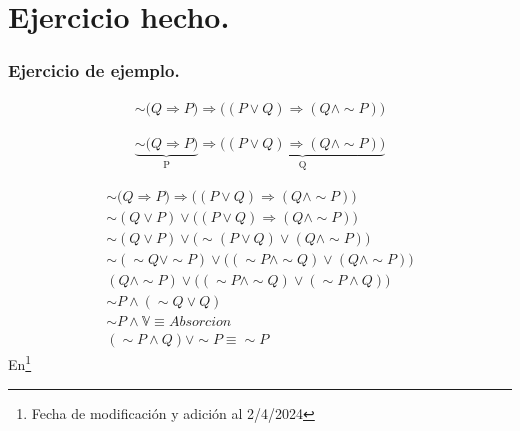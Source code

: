 \documentclass{article}
\begin{document}
\pagebreak

\section*{Ejercicio hecho.}
\subsubsection*{Ejercicio de ejemplo.}

\begin{gather*}
	\sim\big(Q \Rightarrow P\big) \Rightarrow \big((P \vee Q) \Rightarrow (Q \land \sim P)\big) 
\end{gather*}

\begin{gather*}
	\underbrace{\sim\big(Q \Rightarrow P\big)}_\textrm{P} \Rightarrow \underbrace{\big((P \vee Q) \Rightarrow (Q \land \sim P)\big)}_\textrm{Q}
\end{gather*}

\begin{gather}
	\sim\big(Q \Rightarrow P\big) \Rightarrow \big((P \vee Q) \Rightarrow (Q \land \sim P)\big) \\
	\sim(Q \vee P) \vee \big((P \vee Q) \Rightarrow (Q \land \sim P)\big) \\
	\sim(Q \vee P) \vee \big(\sim(P \vee Q) \vee (Q \land \sim P) \big) \\
	\sim(\sim Q \vee \sim P) \vee \big((\sim P \land \sim Q) \vee (Q \land \sim P)\big) \\
	(Q \land \sim P) \vee \big((\sim P \land \sim Q) \vee (\sim P \land Q)\big) \\
	\sim P \land (\sim Q \vee Q) \\
	\sim P \land \mathds{V} \equiv Absorcion \\
	(\sim P \land Q) \vee \sim P \equiv \sim P
\end{gather} En\footnote[2]{Fecha de modificación y adición al 2/4/2024}
\end{document}
